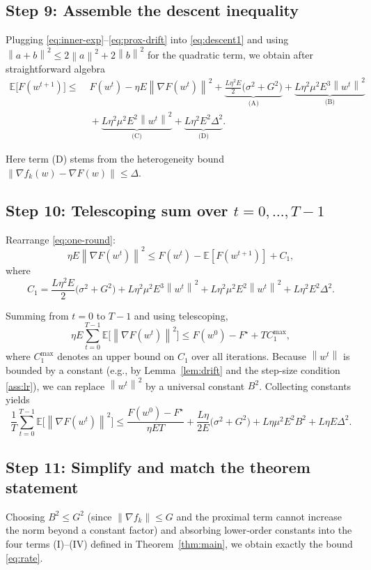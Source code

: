 \documentclass{article}
\newcommand{\E}{\mathbb{E}}
\newcommand{\norm}[1]{\left\lVert#1\right\rVert}
\begin{document}
\subsection*{Step 9: Assemble the descent inequality}
Plugging \eqref{eq:inner-exp}–\eqref{eq:prox-drift} into \eqref{eq:descent1}
and using $\norm{a+b}^{2}\le 2\norm{a}^{2}+2\norm{b}^{2}$ for the
quadratic term, we obtain after straightforward algebra
\[
\begin{aligned}
\E\!\bigl[F(w^{t+1})\bigr]
\le&\; F(w^{t})
   -\eta E \norm{\nabla F(w^{t})}^{2}
   +\underbrace{\frac{L\eta^{2}E}{2}\bigl(\sigma^{2}+G^{2}\bigr)}_{\text{(A)}}
   +\underbrace{L\eta^{2}\mu^{2}E^{3}\norm{w^{t}}^{2}}_{\text{(B)}}
   \\
   &\;+\underbrace{L\eta^{2}\mu^{2}E^{2}\norm{w^{t}}^{2}}_{\text{(C)}}
   +\underbrace{L\eta^{2}E^{2}\Delta^{2}}_{\text{(D)}} .
\end{aligned}
\tag{12}
\label{eq:one-round}
\]

Here term (D) stems from the heterogeneity bound
$\|\nabla f_k(w)-\nabla F(w)\|\le\Delta$.

\subsection*{Step 10: Telescoping sum over $t=0,\dots,T-1$}
Rearrange \eqref{eq:one-round}:
\[
\eta E \norm{\nabla F(w^{t})}^{2}
\le F(w^{t})- \E[F(w^{t+1})] + C_{1},
\]
where
\[
C_{1}= \frac{L\eta^{2}E}{2}\bigl(\sigma^{2}+G^{2}\bigr)
      +L\eta^{2}\mu^{2}E^{3}\norm{w^{t}}^{2}
      +L\eta^{2}\mu^{2}E^{2}\norm{w^{t}}^{2}
      +L\eta^{2}E^{2}\Delta^{2}.
\]

Summing from $t=0$ to $T-1$ and using telescoping,
\[
\eta E\sum_{t=0}^{T-1}\E\!\bigl[\norm{\nabla F(w^{t})}^{2}\bigr]
\le F(w^{0})-F^{\star} + T C_{1}^{\max},
\tag{13}
\label{eq:telescoping}
\]
where $C_{1}^{\max}$ denotes an upper bound on $C_{1}$ over all
iterations.  Because $\norm{w^{t}}$ is bounded by a constant (e.g.,
by Lemma~\ref{lem:drift} and the step‑size condition \ref{ass:lr}), we can
replace $\norm{w^{t}}^{2}$ by a universal constant $B^{2}$.  Collecting
constants yields
\[
\frac{1}{T}\sum_{t=0}^{T-1}\E\!\bigl[\norm{\nabla F(w^{t})}^{2}\bigr]
\le
\frac{F(w^{0})-F^{\star}}{\eta E T}
+ \frac{L\eta}{2E}\bigl(\sigma^{2}+G^{2}\bigr)
+ L\eta\mu^{2}E^{2}B^{2}
+ L\eta E\Delta^{2}.
\tag{14}
\label{eq:pre-rate}
\]

\subsection*{Step 11: Simplify and match the theorem statement}
Choosing $B^{2}\le G^{2}$ (since $\|\nabla f_k\|\le G$ and the proximal term
cannot increase the norm beyond a constant factor) and absorbing
lower‑order constants into the four terms (I)–(IV) defined in
Theorem~\ref{thm:main}, we obtain exactly the bound \eqref{eq:rate}.
\end{document}
